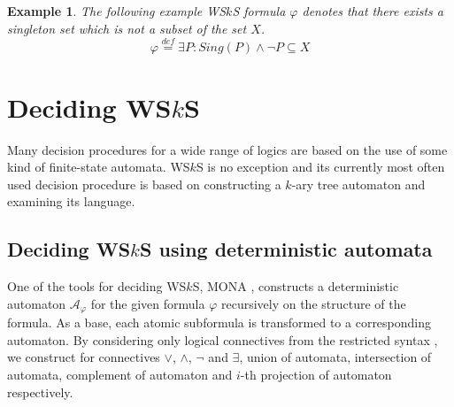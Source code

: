 \documentclass{eeict}
\newtheorem{example}{Example}[section]
\begin{document}
\begin{example} The following example WS$k$S formula $\varphi$ denotes that there
exists a singleton set which is not a subset of the set $X$.
\begin{equation}
 \varphi \overset{\mathit{def}}{=} \exists P: Sing(P) \wedge\neg P \subseteq X
 \label{varphi}
\end{equation}
\end{example}

\section{Deciding WS$k$S}

Many decision procedures for a wide range of logics are based on the use of some
kind of finite-state automata. WS$k$S is no exception and its currently most
often used decision procedure is based on constructing a $k$-ary tree automaton
and examining its language.

\subsection{Deciding WS$k$S using deterministic automata}

One of the tools for deciding WS$k$S, MONA \cite{mona}, constructs a
deterministic automaton $\mathcal{A}_\varphi$ for the given formula
$\varphi$ recursively on the structure of the formula. As a base, each atomic
subformula is transformed to a corresponding automaton.
By considering only logical connectives from
the restricted syntax \cite{tata}, we construct for connectives $\vee$,
$\wedge$, $\neg$ and $\exists$, union of automata, intersection of automata, complement of automaton
and $i$-th projection of automaton respectively.
\end{document}
